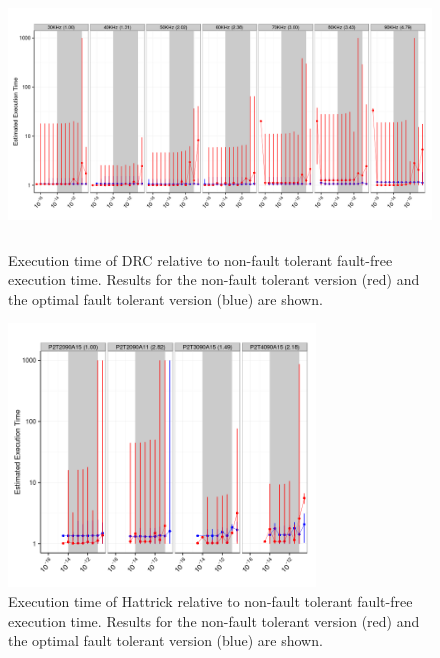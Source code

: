\documentclass{sig-alternate}
\newcommand{\sui}[1]{%
  \textcolor{green}{SC - #1}
}
\begin{document}
\begin{figure}[ht!]
\centering
\includegraphics[height=2.75in]{figs/DRC_EstdCost.png}
\vspace{-10pt}
\caption{Execution time of DRC relative to non-fault tolerant fault-free execution time. Results for the non-fault tolerant version (red) and the optimal fault tolerant version (blue) are shown.}
\vspace{-10pt}
\label{fig:DRC_EstdCost}
\end{figure}

\begin{figure}[ht!]
\centering
\includegraphics[height=2.75in]{figs/Hattrick_EstdCost.png}
\vspace{-10pt}
\caption{Execution time of Hattrick relative to non-fault tolerant fault-free execution time. Results for the non-fault tolerant version (red) and the optimal fault tolerant version (blue) are shown.}
\vspace{-10pt}
\label{fig:Hattrick_EstdCost}
\end{figure}


\end{document}

